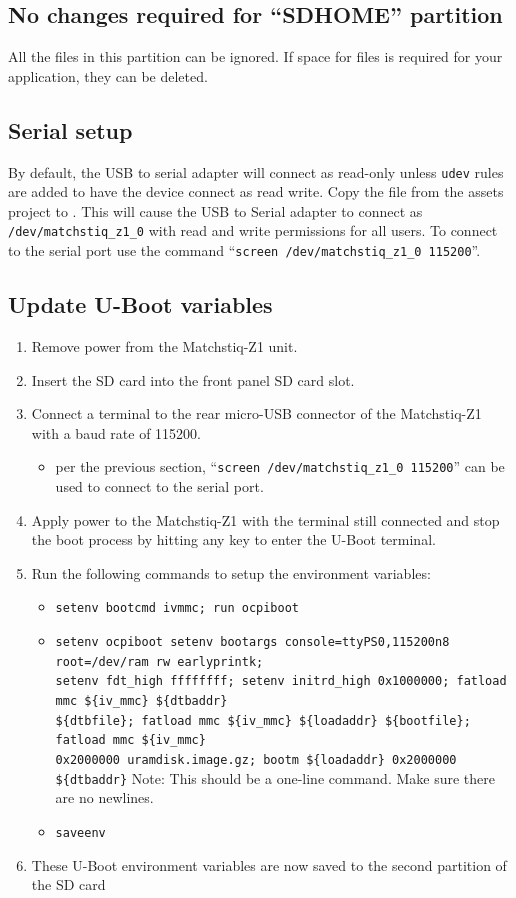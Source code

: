 \subsection*{No changes required for ``SDHOME'' partition}
All the files in this partition can be ignored. If space for files is required for your application, they can be deleted.
\subsection*{Serial setup}
By default, the USB to serial adapter will connect as read-only unless \texttt{udev} rules are added to have the device connect as read write.  Copy the file from the assets project  to .  This will cause the USB to Serial adapter to connect as \texttt{/dev/matchstiq\_z1\_0} with read and write permissions for all users.  To connect to the serial port use the command ``\texttt{screen /dev/matchstiq\_z1\_0 115200}''.
\subsection*{Update U-Boot variables}
\begin{enumerate}
\item Remove power from the Matchstiq-Z1 unit.
\item Insert the SD card into the front panel SD card slot.
\item Connect a terminal to the rear micro-USB connector of the Matchstiq-Z1 with a baud rate of 115200.
\begin{itemize}
\item per the previous section, ``\texttt{screen /dev/matchstiq\_z1\_0 115200}'' can be used to connect to the serial port.
\end{itemize}
\item Apply power to the Matchstiq-Z1 with the terminal still connected and stop the boot process by hitting any key to enter the U-Boot terminal.
\item Run the following commands to setup the environment variables:
\begin{itemize}
\item \texttt{setenv bootcmd \textquotesingle ivmmc; run ocpiboot\textquotesingle}
\item \texttt{setenv ocpiboot \textquotesingle setenv bootargs console=ttyPS0,115200n8 root=/dev/ram rw earlyprintk; \\
setenv fdt\_high ffffffff; setenv initrd\_high 0x1000000; fatload mmc \$\{iv\_mmc\} \$\{dtbaddr\}\\
\$\{dtbfile\}; fatload mmc \$\{iv\_mmc\} \$\{loadaddr\} \$\{bootfile\}; fatload mmc \$\{iv\_mmc\}\\
0x2000000 uramdisk.image.gz; bootm \$\{loadaddr\} 0x2000000 \$\{dtbaddr\}\textquotesingle}
\subitem *Note: This should be a one-line command. Make sure there are no newlines.
\item \texttt{saveenv}
\end{itemize}
\item These U-Boot environment variables are now saved to the second partition of the SD card
\end{enumerate}

